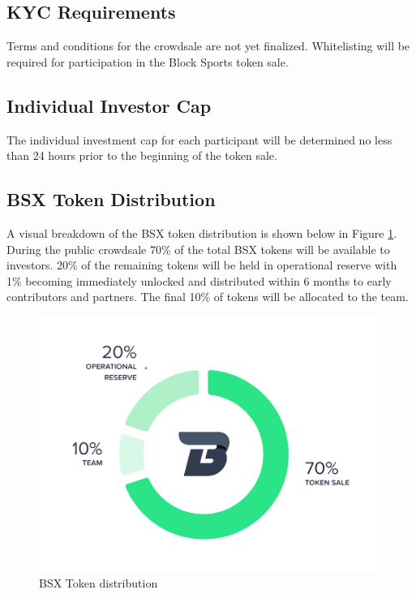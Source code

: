 \documentclass{article}
\begin{document}
	\subsection{KYC Requirements}
Terms and conditions for the crowdsale are not yet finalized. Whitelisting will be required for participation in the Block Sports token sale.

	\subsection{Individual Investor Cap}
The individual investment cap for each participant will be determined no less than 24 hours prior to the beginning of the token sale.

	\subsection{BSX Token Distribution}
A visual breakdown of the BSX token distribution is shown below in Figure \ref{figure:distribution}. During the public crowdsale 70\% of the total BSX tokens will be available to investors. 20\% of the remaining tokens will be held in operational reserve with 1\% becoming immediately unlocked and distributed within 6 months to early contributors and partners. The final 10\% of tokens will be allocated to the team.

\begin{figure}[!htb]
\centering
\includegraphics[scale=.2]{./images/tokensale-diagram.png}
\caption{BSX Token distribution}
\label{figure:distribution}
\end{figure}
\end{document}
